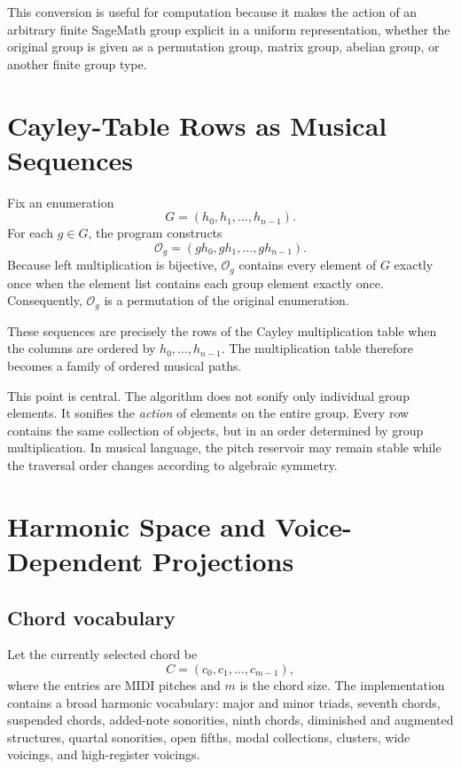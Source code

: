 \documentclass[11pt,a4paper]{article}
\begin{document}
This conversion is useful for computation because it makes the action of an arbitrary finite SageMath group explicit in a uniform representation, whether the original group is given as a permutation group, matrix group, abelian group, or another finite group type.

\section{Cayley-Table Rows as Musical Sequences}

Fix an enumeration
\[
G=(h_0,h_1,\ldots,h_{n-1}).
\]
For each $g\in G$, the program constructs
\[
\mathcal{O}_g=(gh_0,gh_1,\ldots,gh_{n-1}).
\]
Because left multiplication is bijective, $\mathcal{O}_g$ contains every element of $G$ exactly once when the element list contains each group element exactly once. Consequently, $\mathcal{O}_g$ is a permutation of the original enumeration.

These sequences are precisely the rows of the Cayley multiplication table when the columns are ordered by $h_0,\ldots,h_{n-1}$. The multiplication table therefore becomes a family of ordered musical paths.

This point is central. The algorithm does not sonify only individual group elements. It sonifies the \emph{action} of elements on the entire group. Every row contains the same collection of objects, but in an order determined by group multiplication. In musical language, the pitch reservoir may remain stable while the traversal order changes according to algebraic symmetry.

\section{Harmonic Space and Voice-Dependent Projections}

\subsection{Chord vocabulary}

Let the currently selected chord be
\[
C=(c_0,c_1,\ldots,c_{m-1}),
\]
where the entries are MIDI pitches and $m$ is the chord size. The implementation contains a broad harmonic vocabulary: major and minor triads, seventh chords, suspended chords, added-note sonorities, ninth chords, diminished and augmented structures, quartal sonorities, open fifths, modal collections, clusters, wide voicings, and high-register voicings.
\end{document}
